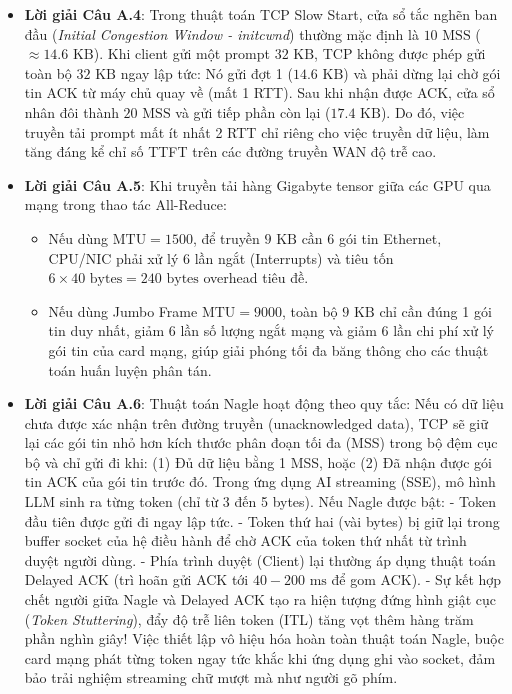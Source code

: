 \begin{itemize}
  \item \textbf{Lời giải Câu A.4}:
  Trong thuật toán TCP Slow Start, cửa sổ tắc nghẽn ban đầu (\textit{Initial Congestion Window - initcwnd}) thường mặc định là $10\text{ MSS}$ ($\approx 14.6\text{ KB}$).
  Khi client gửi một prompt $32\text{ KB}$, TCP không được phép gửi toàn bộ $32\text{ KB}$ ngay lập tức:
  Nó gửi đợt 1 ($14.6\text{ KB}$) và phải dừng lại chờ gói tin ACK từ máy chủ quay về (mất 1 RTT).
  Sau khi nhận được ACK, cửa sổ nhân đôi thành $20\text{ MSS}$ và gửi tiếp phần còn lại ($17.4\text{ KB}$).
  Do đó, việc truyền tải prompt mất ít nhất 2 RTT chỉ riêng cho việc truyền dữ liệu, làm tăng đáng kể chỉ số TTFT trên các đường truyền WAN độ trễ cao.

  \item \textbf{Lời giải Câu A.5}:
  Khi truyền tải hàng Gigabyte tensor giữa các GPU qua mạng trong thao tác All-Reduce:
  \begin{itemize}
    \item Nếu dùng $\text{MTU} = 1500$, để truyền $9\text{ KB}$ cần 6 gói tin Ethernet, CPU/NIC phải xử lý 6 lần ngắt (Interrupts) và tiêu tốn $6 \times 40\text{ bytes} = 240\text{ bytes}$ overhead tiêu đề.
    \item Nếu dùng Jumbo Frame $\text{MTU} = 9000$, toàn bộ $9\text{ KB}$ chỉ cần đúng 1 gói tin duy nhất, giảm 6 lần số lượng ngắt mạng và giảm 6 lần chi phí xử lý gói tin của card mạng, giúp giải phóng tối đa băng thông cho các thuật toán huấn luyện phân tán.
  \end{itemize}

  \item \textbf{Lời giải Câu A.6}:
  Thuật toán Nagle hoạt động theo quy tắc: Nếu có dữ liệu chưa được xác nhận trên đường truyền (unacknowledged data), TCP sẽ giữ lại các gói tin nhỏ hơn kích thước phân đoạn tối đa (MSS) trong bộ đệm cục bộ và chỉ gửi đi khi: (1) Đủ dữ liệu bằng 1 MSS, hoặc (2) Đã nhận được gói tin ACK của gói tin trước đó.
  Trong ứng dụng AI streaming (SSE), mô hình LLM sinh ra từng token (chỉ từ 3 đến 5 bytes). Nếu Nagle được bật:
  - Token đầu tiên được gửi đi ngay lập tức.
  - Token thứ hai (vài bytes) bị giữ lại trong buffer socket của hệ điều hành để chờ ACK của token thứ nhất từ trình duyệt người dùng.
  - Phía trình duyệt (Client) lại thường áp dụng thuật toán Delayed ACK (trì hoãn gửi ACK tới $40 - 200\text{ ms}$ để gom ACK).
  - Sự kết hợp chết người giữa Nagle và Delayed ACK tạo ra hiện tượng đứng hình giật cục (\textit{Token Stuttering}), đẩy độ trễ liên token (ITL) tăng vọt thêm hàng trăm phần nghìn giây!
  Việc thiết lập  vô hiệu hóa hoàn toàn thuật toán Nagle, buộc card mạng phát từng token ngay tức khắc khi ứng dụng ghi vào socket, đảm bảo trải nghiệm streaming chữ mượt mà như người gõ phím.


\end{itemize}
